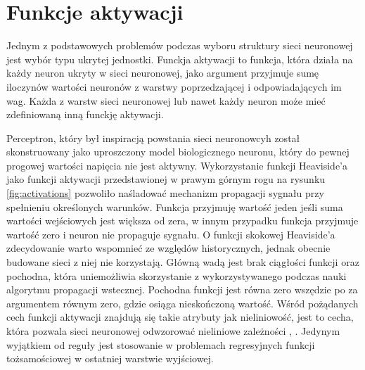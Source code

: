 \documentclass[11pt]{book}
\theoremstyle{definition}
\begin{document}
\section{Funkcje aktywacji}
\label{activation}
Jednym z podstawowych problemów podczas wyboru struktury sieci neuronowej jest wybór typu ukrytej jednostki. Funckja aktywacji to funkcja, która działa na każdy neuron ukryty w sieci neuronowej, jako argument przyjmuje sumę iloczynów wartości neuronów z warstwy poprzedzającej i odpowiadających im wag. Każda z warstw sieci  neuronowej lub nawet każdy neuron może mieć zdefiniowaną inną funckję aktywacji.

Perceptron, który był inspiracją powstania sieci neuronowcyh został skonstruowany jako uproszczony model biologicznego neuronu, który do pewnej progowej wartości napięcia nie jest aktywny. Wykorzystanie funkcji Heaviside'a jako funkcji aktywacji przedstawionej w prawym górnym rogu na rysunku \ref{fig:activations} pozwoliło naśladować mechanizm propagacji sygnału przy spełnieniu określonych warunków. Funkcja przyjmuję wartość jeden jeśli suma wartości wejściowych jest większa od zera, w innym przypadku funkcja przyjmuje wartość zero i neuron nie propaguje sygnału. O funkcji skokowej Heaviside'a zdecydowanie warto wspomnieć ze względów historycznych, jednak obecnie budowane sieci z niej nie korzystają. Główną wadą jest brak ciągłości funkcji oraz pochodna, która uniemożliwia skorzystanie z wykorzystywanego podczas nauki algorytmu propagacji wstecznej\cite{1986Natur.323..533R}. Pochodna funkcji jest równa zero wszędzie po za argumentem równym zero, gdzie osiąga nieskończoną wartość. Wśród pożądanych cech funkcji aktywacji znajdują się takie atrybuty jak nieliniowość, jest to cecha, która pozwala sieci neuronowej odwzorować nieliniowe zależności \cite{LeCun:1998:EB:645754.668382}, \cite{Hornik1989}. Jedynym wyjątkiem od reguły jest stosowanie w problemach regresyjnych funkcji tożsamościowej w ostatniej warstwie wyjściowej. 
\end{document}
